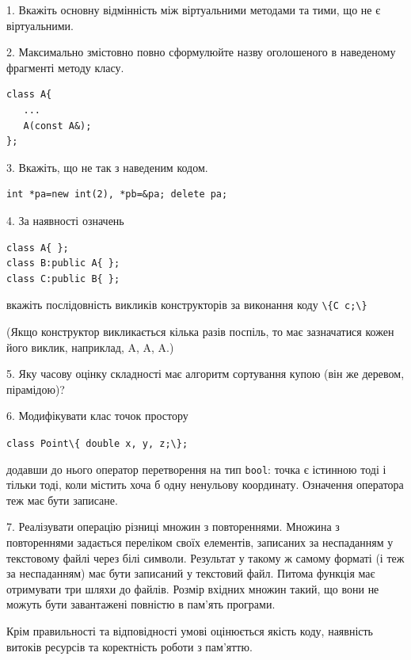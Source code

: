 \documentclass[12pt, ukrainian]{article}
\def\code#1{\Verb!#1!}
\begin{document}
{%
1. Вкажіть основну відмінність між віртуальними методами та тими, що не є віртуальними.%
\par
\vspace{2mm}
2. Максимально змістовно повно сформулюйте назву оголошеного в наведеному фрагменті методу класу.
\vspace{-3mm}
\begin{verbatim}class A{
   ...
   A(const A&);
};\end{verbatim}
\vspace{-3mm}
\par
\vspace{2mm}
3. Вкажіть, що не так з наведеним кодом.
\vspace{-3mm}
\begin{verbatim}int *pa=new int(2), *pb=&pa; delete pa;\end{verbatim}
\vspace{-3mm}
\par
\vspace{2mm}
4. За наявності означень
\vspace{-3mm}
\begin{verbatim}
class A{ };
class B:public A{ };
class C:public B{ };\end{verbatim}
\vspace{-3mm}
вкажіть послідовність викликів конструкторів за виконання коду \code{\{C c;\}} 

(Якщо конструктор викликається кілька разів поспіль, то має зазначатися кожен його виклик, наприклад, A, A, A.)

\vspace{2mm}
5. Яку часову оцінку складності має алгоритм сортування купою (він же деревом, пірамідою)?
\par
\vspace{2mm}
6. Модифікувати клас точок простору 

\qquad\code{class Point\{ double x, y, z;\};}


додавши до нього оператор перетворення на тип \code{bool}: точка є істинною тоді і тільки тоді, коли містить хоча б одну ненульову координату. Означення оператора теж має бути записане.%
\par
\vspace{2mm}
7. 
Реалізувати операцію різниці множин з повтореннями. Множина з повтореннями задається переліком своїх елементів, записаних за неспаданням у текстовому файлі через білі символи. Результат у такому ж самому форматі (і теж за неспаданням) має бути записаний у текстовий файл. Питома функція має отримувати три шляхи до файлів. Розмір вхідних множин такий, що вони не можуть бути завантажені повністю в пам’ять програми.

Крім правильності та відповідності умові оцінюється якість коду, наявність витоків ресурсів та коректність роботи з пам'яттю. 

}
\end{document}
